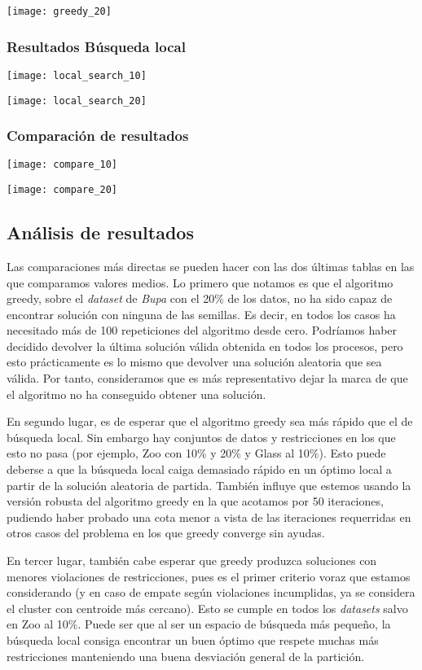 \documentclass[11pt]{article}
\begin{document}
\texttt{[image: greedy\_20]}

\subsubsection{Resultados Búsqueda local}

\texttt{[image: local\_search\_10]}

\texttt{[image: local\_search\_20]}

\subsubsection{Comparación de resultados}

\texttt{[image: compare\_10]}

\texttt{[image: compare\_20]}

\subsection{Análisis de resultados}

Las comparaciones más directas se pueden hacer con las dos últimas tablas en las que comparamos valores medios. Lo primero que notamos es que el algoritmo greedy, sobre el \emph{dataset} de \emph{Bupa} con el 20\% de los datos, no ha sido capaz de encontrar solución con ninguna de las semillas. Es decir, en todos los casos ha necesitado más de 100 repeticiones del algoritmo desde cero. Podríamos haber decidido devolver la última solución válida obtenida en todos los procesos, pero esto prácticamente es lo mismo que devolver una solución aleatoria que sea válida. Por tanto, consideramos que es más representativo dejar la marca de que el algoritmo no ha conseguido obtener una solución.

En segundo lugar, es de esperar que el algoritmo greedy sea más rápido que el de búsqueda local. Sin embargo hay conjuntos de datos y restricciones en los que esto no pasa (por ejemplo, Zoo con 10\% y 20\% y Glass al 10\%). Esto puede deberse a que la búsqueda local caiga demasiado rápido en un óptimo local a partir de la solución aleatoria de partida. También influye que estemos usando la versión robusta del algoritmo greedy en la que acotamos por 50 iteraciones, pudiendo haber probado una cota menor a vista de las iteraciones requerridas en otros casos del problema en los que greedy converge sin ayudas.

En tercer lugar, también cabe esperar que greedy produzca soluciones con menores violaciones de restricciones, pues es el primer criterio voraz que estamos considerando (y en caso de empate según violaciones incumplidas, ya se considera el cluster con centroide más cercano). Esto se cumple en todos los \emph{datasets} salvo en Zoo al 10\%. Puede ser que al ser un espacio de búsqueda más pequeño, la búsqueda local consiga encontrar un buen óptimo que respete muchas más restricciones manteniendo una buena desviación general de la partición.
\end{document}
